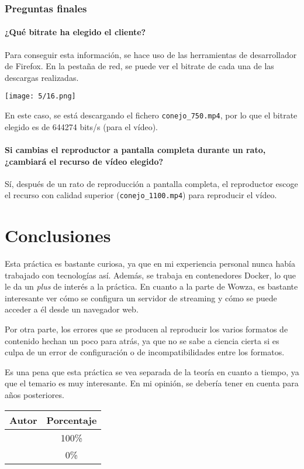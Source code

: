 \subsubsection{Preguntas finales}
\paragraph{¿Qué bitrate ha elegido el cliente?}
Para conseguir esta información, se hace uso de las herramientas de desarrollador
de Firefox. En la pestaña de red, se puede ver el bitrate de cada una de las
descargas realizadas.

\begin{minipage}{\linewidth}
	\centering
	\texttt{[image: 5/16.png]}
	\label{fig:5/16}
\end{minipage}

En este caso, se está descargando el fichero \Verb#conejo_750.mp4#, por lo que
el bitrate elegido es de 644274 bits/s (para el vídeo).

\paragraph{Si cambias el reproductor a pantalla completa durante un rato, ¿cambiará el recurso de vídeo elegido?}
Sí, después de un rato de reproducción a pantalla completa, el reproductor escoge el recurso
con calidad superior (\Verb#conejo_1100.mp4#) para reproducir el vídeo.

\section{Conclusiones}
Esta práctica es bastante curiosa, ya que en mi experiencia personal nunca había trabajado
con tecnologías así. Además, se trabaja en contenedores Docker, lo que le da un \textit{plus}
de interés a la práctica. En cuanto a la parte de Wowza, es bastante interesante ver cómo
se configura un servidor de streaming y cómo se puede acceder a él desde un navegador web.

Por otra parte, los errores que se producen al reproducir los varios formatos de contenido
hechan un poco para atrás, ya que no se sabe a ciencia cierta si es culpa de un error de
configuración o de incompatibilidades entre los formatos.

Es una pena que esta práctica se vea separada de la teoría en cuanto a tiempo, ya que
el temario es muy interesante. En mi opinión, se debería tener en cuenta para años posteriores.

\begin{center}
	\begin{tabular}{|c|c|}
		\hline
		\textbf{Autor} & \textbf{Porcentaje} \\
		\hline
		\hline
		\authorOne & 100\% \\
		\authorTwo & 0\% \\
		\hline
	\end{tabular}
\end{center}
